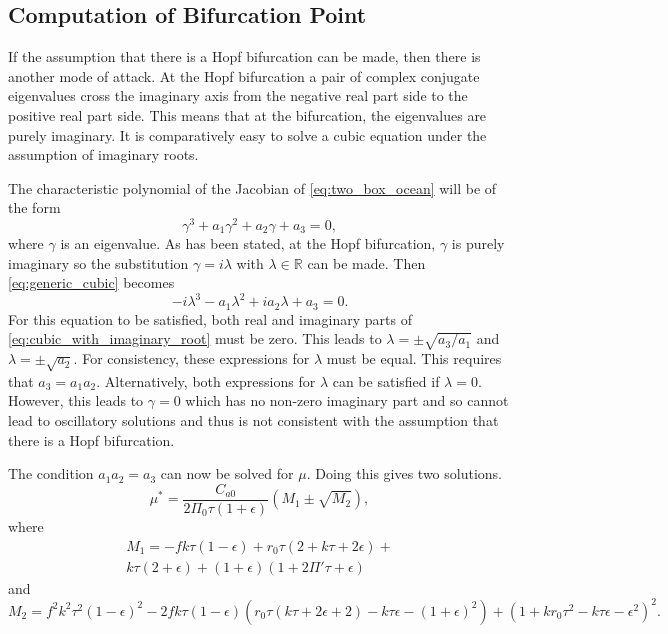 \subsection{Computation of Bifurcation Point}
If the assumption that there is a Hopf bifurcation can be made, then there is another mode of attack. At the Hopf bifurcation a pair of complex conjugate eigenvalues
cross the imaginary axis from the negative real part side to the positive real part side. This means that at the bifurcation, the eigenvalues are purely imaginary. It is
comparatively easy to solve a cubic equation under the assumption of imaginary roots.

The characteristic polynomial of the Jacobian of \cref{eq:two_box_ocean} will be of the form
\begin{equation}
  \label{eq:generic_cubic}
  \gamma^3 + a_1 \gamma^2 + a_2 \gamma + a_3 = 0,
\end{equation}
where $\gamma$ is an eigenvalue. As has been stated, at the Hopf bifurcation, $\gamma$ is purely imaginary so the substitution $\gamma = i\lambda$ with $\lambda \in \mathbb{R}$
can be made. Then \cref{eq:generic_cubic} becomes
\begin{equation}
  \label{eq:cubic_with_imaginary_root}
  -i\lambda^3 - a_1 \lambda^2 + i a_2 \lambda + a_3 = 0. 
\end{equation}
For this equation to be satisfied, both real and imaginary parts of \cref{eq:cubic_with_imaginary_root} must be zero. This leads to
$\lambda = \pm \sqrt{a_3/a_1}$ and $\lambda = \pm \sqrt{a_2}$. For consistency, these expressions for $\lambda$ must be equal. This requires that $a_3 = a_1a_2$.
Alternatively, both expressions for $\lambda$ can be satisfied if $\lambda = 0$. However, this leads to $\gamma = 0$ which has no non-zero imaginary part and so cannot lead to
oscillatory solutions and thus is not consistent with the assumption that there is a Hopf bifurcation.

The condition $a_1a_2=a_3$  can now be solved for $\mu$. Doing this gives two solutions.
\begin{equation}
  \label{eq:mu_two_box}
  \mu^* = \frac{C_{a0}}{2 \Pi_0 \tau  (1+\epsilon)} \left(M_1\pm\sqrt{M_2}\right),
\end{equation}
where
\begin{equation}
  \begin{split}
    M_1 = -f k \tau  (1-\epsilon)+r_0 \tau  (2 + k \tau +2 \epsilon) + \\ k \tau  (2+\epsilon)+(1+\epsilon) (1+2 \Pi' \tau +\epsilon)
\end{split}
\end{equation}
and
\begin{dmath}
  M_2 = f^2 k^2 \tau ^2 (1-\epsilon)^2-2 f k \tau  (1-\epsilon) \left(r_0 \tau  (k \tau +2 \epsilon +2)-k \tau  \epsilon -(1+\epsilon)^2\right) 
  +\left(1+k r_0 \tau ^2-k \tau  \epsilon -\epsilon ^2\right)^2.
\end{dmath}

